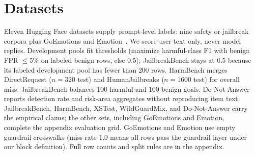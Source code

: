 \section{Datasets}
\label{sec:datasets}

Eleven Hugging Face datasets supply prompt-level labels: nine safety or jailbreak corpora plus GoEmotions and Emotion~\cite{hartvigsen2022toxigen,markov2023holistic,lin2023toxicchat,deepset2024promptinjections,han2024wildguard,wang2024donotanswer,rottger2024xstest,mazeika2024harmbench,chao2024jailbreakbench,demszky2020goemotions,saravia2018carer}.
We score user text only, never model replies.
Development pools fit thresholds (maximize harmful-class F1 with benign FPR $\leq 5\%$ on labeled benign rows, else 0.5); JailbreakBench stays at 0.5 because its labeled development pool has fewer than 200 rows.
HarmBench merges DirectRequest ($n=320$ test) and HumanJailbreaks ($n=1600$ test) for overall miss.
JailbreakBench balances 100 harmful and 100 benign goals.
Do-Not-Answer reports detection rate and risk-area aggregates without reproducing item text.
JailbreakBench, HarmBench, XSTest, WildGuardMix, and Do-Not-Answer carry the empirical claims; the other sets, including GoEmotions and Emotion, complete the appendix evaluation grid.
GoEmotions and Emotion use empty guardrail crosswalks (miss rate 1.0 means all rows pass the guardrail layer under our block definition).
Full row counts and split rules are in the appendix.
